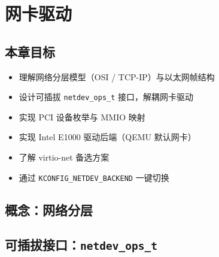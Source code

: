 \chapter{网卡驱动}
\label{ch:nic-driver}

\section{本章目标}

\begin{itemize}
  \item 理解网络分层模型（OSI / TCP-IP）与以太网帧结构
  \item 设计可插拔 \texttt{netdev\_ops\_t} 接口，解耦网卡驱动
  \item 实现 PCI 设备枚举与 MMIO 映射
  \item 实现 Intel E1000 驱动后端（QEMU 默认网卡）
  \item 了解 virtio-net 备选方案
  \item 通过 \texttt{KCONFIG\_NETDEV\_BACKEND} 一键切换
\end{itemize}

\section{概念：网络分层}
\label{sec:nic-concept}


\section{可插拔接口：\texttt{netdev\_ops\_t}}
\label{sec:nic-interface}

